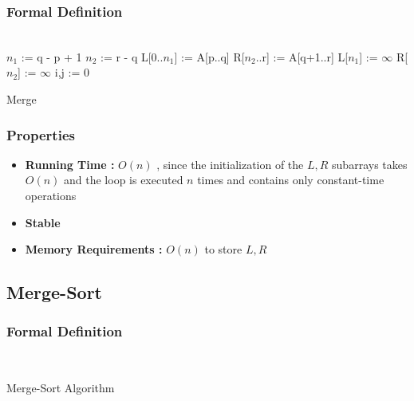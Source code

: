 \subsubsection{Formal Definition}

\begin{algorithm}[H]
	\DontPrintSemicolon
	\SetAlgoLined{}
	\\
	$n_1$ := q - p + 1{}\;
	$n_2$ := r - q\;
	L[0..$n_1$] := A[p..q]{}\;
	R[$n_2$..r] := A[q+1..r]\;
	L[$n_1$] := $\infty${}\;
	R[$n_2$] := $\infty$\;
	i,j := 0\;
		\caption{Merge}
\end{algorithm}

\subsubsection{Properties}

		\begin{itemize}
			\item\textbf{Running Time : } $O(n)$ , since the initialization of
the $L , R$ subarrays takes $O(n)$ and the loop is executed $n$ times and
contains only constant-time operations
			\item\textbf{Stable}
			\item\textbf{Memory Requirements : } $O(n)$ to store $L, R$	
		\end{itemize}

\subsection{Merge-Sort}


\subsubsection{Formal Definition}

	\begin{algorithm}[H]
	\DontPrintSemicolon
	\SetAlgoLined{}
	\\
	\caption{Merge-Sort Algorithm}
	\end{algorithm}

